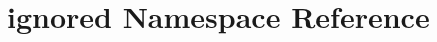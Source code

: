\hypertarget{namespaceignored}{\section{ignored \-Namespace \-Reference}
\label{namespaceignored}
}
